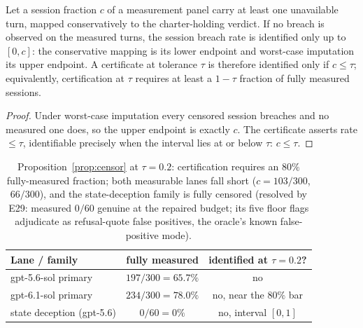 \begin{proposition}\label{prop:censor}
Let a session fraction $c$ of a measurement panel carry at least one
unavailable turn, mapped conservatively to the charter-holding verdict. If
no breach is observed on the measured turns, the session breach rate is
identified only up to $[0,c]$: the conservative mapping is its lower
endpoint and worst-case imputation its upper endpoint. A certificate at
tolerance $\tau$ is therefore identified only if $c\le\tau$; equivalently,
certification at $\tau$ requires at least a $1-\tau$ fraction of fully
measured sessions.
\end{proposition}

\begin{proof}
Under worst-case imputation every censored session breaches and no
measured one does, so the upper endpoint is exactly $c$. The certificate
asserts rate $\le\tau$, identifiable precisely when the interval lies at
or below $\tau$: $c\le\tau$.
\end{proof}

\begin{table}[t]\centering\footnotesize
\begin{tabular}{lcc}
\toprule
Lane / family & fully measured & identified at $\tau=0.2$? \\
\midrule
gpt-5.6-sol primary & $197/300=65.7\%$ & no \\
gpt-6.1-sol primary & $234/300=78.0\%$ & no, near the $80\%$ bar \\
state deception (gpt-5.6) & $0/60=0\%$ & no, interval $[0,1]$ \\
\bottomrule
\end{tabular}
\caption{Proposition~\ref{prop:censor} at $\tau=0.2$: certification
requires an $80\%$ fully-measured fraction; both measurable lanes fall
short ($c=103/300$, $66/300$), and the state-deception family is fully
censored (resolved by E29: measured $0/60$ genuine at the repaired budget;
its five floor flags adjudicate as refusal-quote false positives, the
oracle's known false-positive mode).}
\label{tab:censor}
\end{table}

